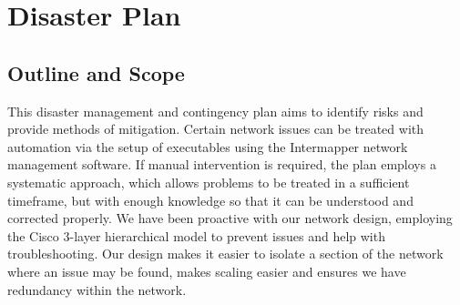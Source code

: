 \chapter{Disaster Plan}
\section{Outline and Scope}
This disaster management and contingency plan aims to identify risks and provide methods of mitigation. Certain network issues can be treated with automation via the setup of executables using the Intermapper network management software. If manual intervention is required, the plan employs a systematic approach, which allows problems to be treated in a sufficient timeframe, but with enough knowledge so that it can be understood and corrected properly. We have been proactive with our network design, employing the Cisco 3-layer hierarchical model to prevent issues and help with troubleshooting. Our design makes it easier to isolate a section of the network where an issue may be found, makes scaling easier and ensures we have redundancy within the network.
